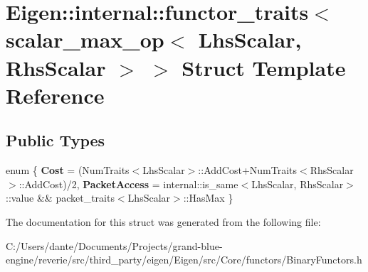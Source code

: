 \hypertarget{struct_eigen_1_1internal_1_1functor__traits_3_01scalar__max__op_3_01_lhs_scalar_00_01_rhs_scalar_01_4_01_4}{}\section{Eigen\+::internal\+::functor\+\_\+traits$<$ scalar\+\_\+max\+\_\+op$<$ Lhs\+Scalar, Rhs\+Scalar $>$ $>$ Struct Template Reference}
\label{struct_eigen_1_1internal_1_1functor__traits_3_01scalar__max__op_3_01_lhs_scalar_00_01_rhs_scalar_01_4_01_4}
\subsection*{Public Types}
\begin{DoxyCompactItemize}
\item 
\mbox{\label{struct_eigen_1_1internal_1_1functor__traits_3_01scalar__max__op_3_01_lhs_scalar_00_01_rhs_scalar_01_4_01_4_a16f50a9d280796698482e1d2f73f7f54}} 
enum \{ {\bfseries Cost} = (Num\+Traits$<$Lhs\+Scalar$>$\+::Add\+Cost+\+Num\+Traits$<$Rhs\+Scalar$>$\+::Add\+Cost)/2, 
{\bfseries Packet\+Access} = internal\+::is\+\_\+same$<$Lhs\+Scalar, Rhs\+Scalar$>$\+::value \&\& packet\+\_\+traits$<$Lhs\+Scalar$>$\+::Has\+Max
 \}
\end{DoxyCompactItemize}


The documentation for this struct was generated from the following file\+:\begin{DoxyCompactItemize}
\item 
C\+:/\+Users/dante/\+Documents/\+Projects/grand-\/blue-\/engine/reverie/src/third\+\_\+party/eigen/\+Eigen/src/\+Core/functors/Binary\+Functors.\+h\end{DoxyCompactItemize}
